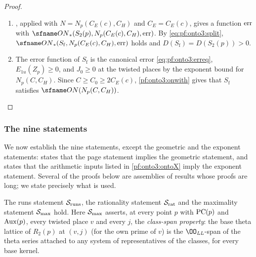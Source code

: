 \begin{proof}
\begin{enumerate}[label=(\arabic*)]
With $\mathrm{Rat}(p)$ these give \ref{pf:onto3:L:ident} and \ref{pf:onto3:L:tw2}
( and
, which deduce these two leaves from the record conditions,
the link conditions and $\mathrm{Rat}(p)$).
\item {}, applied with $N=N_p(C_E(c),C_H)$ and $C_E=C_E(c)$, gives a function
$\mathrm{err}$ with $\ontothreeONw(S_2(p),N_p(C_E(c),C_H),\ontothreeerr)$. By \eqref{eq:pf:onto3:split},
$\ontothreeONw(S_{\mathrm f},N_p(C_E(c),C_H),\ontothreeerr)$ holds and $D(S_{\mathrm f})=D(S_2(p))>0$.
\item The error function of $S_{\mathrm f}$ is the canonical error \eqref{eq:pf:onto3:erreq}, $E_{1u}(Z_p)\ge0$,
and $J_0\ge0$ at the twisted places by the exponent bound for $N_p(C,C_H)$. Since $C\ge C_0\ge2C_E(c)$,
\cref{pf:onto3:onwith} gives that $S_{\mathrm f}$ satisfies $\ontothreeON(N_p(C,C_H))$.\qedhere
\end{enumerate}
\end{proof}

\subsubsection{The nine statements}

We now establish the nine statements, except the geometric and the exponent statements:
 states that the page statement implies the geometric statement,
and  states that the arithmetic inputs listed
in \cref{pf:onto3:ontoX} imply the exponent statement. Several of the proofs below are assemblies of results whose
proofs are long; we state precisely what is used.

\begin{proposition}\label{pf:onto3:runs}
The runs statement $\mathcal{S}_{\mathrm{runs}}$, the rationality statement $\mathcal{S}_{\mathrm{rat}}$ and the maximality
statement $\mathcal{S}_{\mathrm{max}}$ hold. Here $\mathcal{S}_{\mathrm{max}}$ asserts, at every point $p$ with $\mathrm{PC}(p)$ and
$\mathrm{Aux}(p)$, every twisted place $v$ and every $j$, the \emph{class-span property}: the base theta lattice
of $R_2(p)$ at $(v,j)$ (for the own prime of $v$) is the $\OO_{\mathit{LL}}$-span of the theta series attached to
any system of representatives of the classes, for every base kernel.
\end{proposition}

